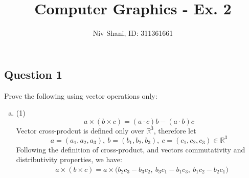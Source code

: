 \documentclass{article}
\title{\textbf{Computer Graphics - Ex. 2}}
\author{Niv Shani, ID: 311361661}
\date{}
\begin{document}
    \maketitle
    \vspace{1cm}

    \subsection*{Question 1}
    Prove the following using vector operations only:
    \begin{enumerate}[(a)]
        We'll define the following vector notations:
        $$v = AB\qquad u = AC$$
        Therefore using vector addition, we have:
        $$BC = -v + u = u - v$$
        Doing the same for the two halves, we have:
        $$EF = -\frac{1}{2}v + \frac{1}{2}u = \frac{1}{2}(u - v)$$
        Therefore clearly, $EF \parallel BC$ and has half of its length. $\quad\qedsymbol$
        \newpage
        \item (1) $$\boxed{a\times(b\times c) = (a\cdot c)b-(a\cdot b)c}$$
        Vector cross-prodcut is defined only over $\mathbb{R}^3$, therefore let $$a = (a_1, a_2, a_3),\ b=(b_1,b_2,b_3),\ c=(c_1,c_2,c_3)\in\mathbb{R}^3$$
        Following the definition of cross-product, and vectors commutativity and distributivity properties, we have:
        \begin{align*}
            &a\times(b\times c) = a\times\big( b_2c_3 - b_3c_2,\ b_3c_1 - b_1c_3,\ b_1c_2 - b_2c_1 \big)\\

\end{align*}
\end{enumerate}
\end{document}
